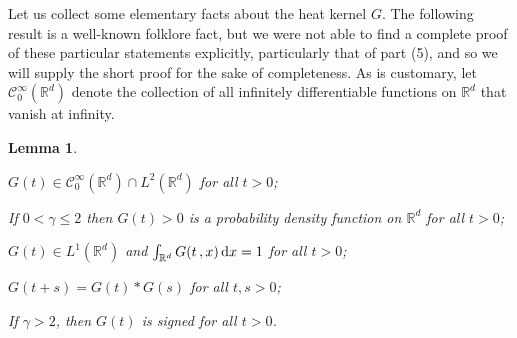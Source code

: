 \documentclass[reqno]{amsart}
\newcommand{\<}{\langle}
\renewcommand{\>}{\rangle}
\newcommand{\R}{\mathbb{R}}
\newcommand{\1}{\mathbb{1}}
\renewcommand{\d}{{\rm d}}
\renewcommand{\le}{\leqslant}
\newtheorem{lemma}[stat]{Lemma}
\theoremstyle{definition}
\numberwithin{equation}{section}
\begin{document}
Let us collect some elementary facts about the heat kernel $G$. The following
result is a well-known folklore fact, but we were not able to find a complete proof of
these particular statements explicitly, particularly that of part (5), 
and so we will supply the short proof
for the sake of completeness. As is customary, let $\mathcal{C}_0^\infty(\R^d)$
denote the collection of all infinitely differentiable functions on $\R^d$
that vanish at infinity.

\begin{lemma}\label{lem:G}
	\begin{compactenum}[\rm (1)]
	\item $G(t)\in \mathcal{C}_0^\infty(\R^d)\cap L^2(\R^d)$ for all $t>0$;
	\item If $0<\gamma \le 2$ then $G(t)>0$ is a probability density function on $\R^d$ for all $t>0$;
	\item $G(t)\in L^1(\R^d)$ and 
		$\int_{\R^d} G(t\,,x)\,\d x=1$ for all $t>0$;
	\item $G(t+s)=G(t)*G(s)$ for all $t,s>0$;
	\item If $\gamma>2$, then $G(t)$ is signed for all $t>0$.
	\end{compactenum}
\end{lemma}
\end{document}
